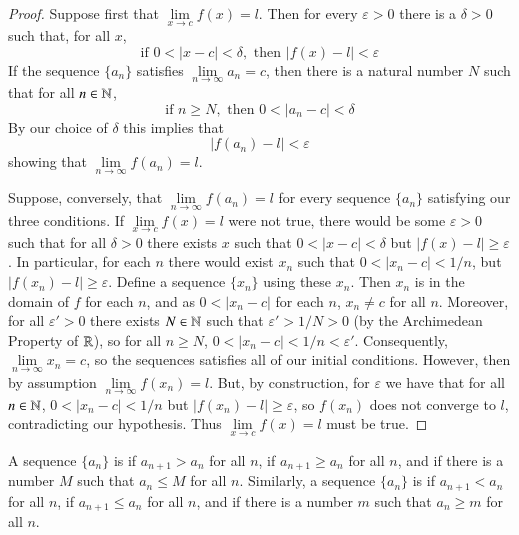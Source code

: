 \documentclass[12pt, a4paper, oneside, openright, titlepage]{book}
\begin{document}
\begin{proof}
    Suppose first that $\lim\limits_{x\rightarrow c}f(x) = l$. Then for every $\varepsilon > 0$ there is a $\delta > 0$ such that, for all $x$, \begin{equation*}
        \text{if } 0 < |x-c| < \delta, \text{ then } |f(x) - l| < \varepsilon
    \end{equation*}
    If the sequence $\{a_n\}$ satisfies $\lim\limits_{n\rightarrow \infty}a_n = c$, then there is a natural number $N$ such that for all $n \in \mathbb N$, \begin{equation*}
        \text{if } n \geq N, \text{ then } 0 < |a_n - c| < \delta
    \end{equation*}
    By our choice of $\delta$ this implies that \begin{equation*}
        |f(a_n) - l| <\varepsilon
    \end{equation*}
    showing that $\lim\limits_{n\rightarrow \infty} f(a_n) = l$.


    Suppose, conversely, that $\lim\limits_{n\rightarrow \infty}f(a_n) = l$ for every sequence $\{a_n\}$ satisfying our three conditions. If $\lim\limits_{x\rightarrow c}f(x) = l$ were not true, there would be some $\varepsilon > 0$ such that for all $\delta > 0$ there exists $x$ such that $0 < |x-c| < \delta$ but $|f(x) - l| \geq \varepsilon$. In particular, for each $n$ there would exist $x_n$ such that $0<|x_n - c| < 1/n$, but $|f(x_n) - l| \geq \varepsilon$. Define a sequence $\{x_n\}$ using these $x_n$. Then $x_n$ is in the domain of $f$ for each $n$, and as $0 < |x_n-c|$ for each $n$, $x_n \neq c$ for all $n$. Moreover, for all $\varepsilon' > 0$ there exists $N \in \mathbb N$ such that $\varepsilon' > 1/N > 0$ (by the Archimedean Property of $\mathbb R$), so for all $n \geq N$, $0 < |x_n - c| < 1/n < \varepsilon'$. Consequently, $\lim\limits_{n\rightarrow \infty}x_n = c$, so the sequences satisfies all of our initial conditions. However, then by assumption $\lim\limits_{n\rightarrow \infty}f(x_n) = l$. But, by construction, for $\varepsilon$ we have that for all $n \in \mathbb N$, $0 < |x_n - c| < 1/n$ but $|f(x_n) - l| \geq \varepsilon$, so $f(x_n)$ does not converge to $l$, contradicting our hypothesis. Thus $\lim\limits_{x\rightarrow c}f(x) = l$ must be true.
\end{proof}


\begin{defn}
    A sequence $\{a_n\}$ is  if $a_{n+1} > a_n$ for all $n$,  if $a_{n+1} \geq a_n$ for all $n$, and  if there is a number $M$ such that $a_n \leq M$ for all $n$. Similarly, a sequence $\{a_n\}$ is  if $a_{n+1} < a_n$ for all $n$,  if $a_{n+1} \leq a_n$ for all $n$, and  if there is a number $m$ such that $a_n \geq m$ for all $n$.
\end{defn}
\end{document}
